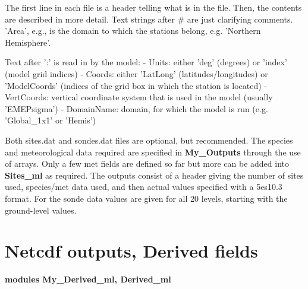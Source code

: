 The first line in each file is a header telling what is in the file.
Then, the contents are described in more detail. Text strings after
\# are just clarifying comments. 'Area', e.g., is the domain to which
the stations belong, e.g. 'Northern Hemisphere'.

Text after ':' is read in by the model:\newline
- Units: either 'deg' (degrees) or 'index' (model grid indices)\newline
- Coords: either 'LatLong' (latitudes/longitudes) or 'ModelCoords'
(indices of the grid box in which the station is located)\newline
- VertCoords: vertical coordinate system that is used in the model (usually
'EMEPsigma')\newline
- DomainName: domain, for which the model is run (e.g. 'Global\_1x1' or 'Hemis')\newline


Both sites.dat and sondes.dat files are optional, but recommended.
\newline
The species and meteorological data required are specified in {\bf My\_Outputs}
through the use of arrays. Only a few met fields are defined so far but
more can be added into {\bf Sites\_ml} as required. The outputs consist
of a header giving the number of sites used, species/met data used, and
then actual values specified with a 5es10.3 format. For the sonde data
values are given for all 20 levels, starting with the ground-level values.




\section{Netcdf outputs, Derived fields}

{\bf modules My\_Derived\_ml, Derived\_ml }\\

% 

